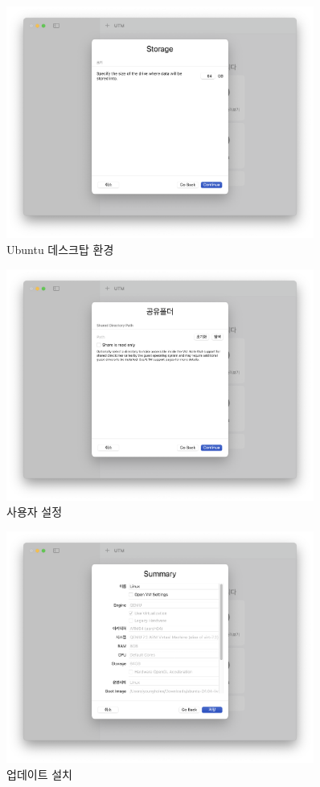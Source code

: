 \begin{figure}[htbp]
    \centering
    \includegraphics[width=0.9\textwidth]{images/chapter2Images/ch2_image_10.png}
    \caption{Ubuntu 데스크탑 환경}
\end{figure}

\begin{figure}[htbp]
    \centering
    \includegraphics[width=0.9\textwidth]{images/chapter2Images/ch2_image_11.png}
    \caption{사용자 설정}
\end{figure}

\begin{figure}[htbp]
    \centering
    \includegraphics[width=0.9\textwidth]{images/chapter2Images/ch2_image_12.png}
    \caption{업데이트 설치}
\end{figure}

